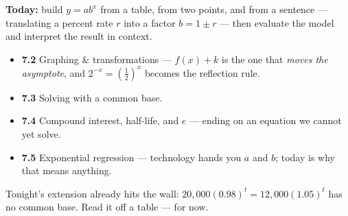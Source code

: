 \documentclass[aspectratio=169, 11pt]{beamer}
\begin{document}
\begin{frame}[t, plain]
  \textbf{Today:} build $y=ab^{x}$ from a table, from two points, and from a sentence --- translating
  a percent rate $r$ into a factor $b=1\pm r$ --- then evaluate the model and interpret the result in
  context.\\[8pt]
  \begin{itemize}\setlength{\itemsep}{3pt}
    \item \textbf{7.2} Graphing \& transformations --- $f(x)+k$ is the one that \emph{moves the asymptote}, and $2^{-x}=\left(\frac12\right)^{x}$ becomes the reflection rule.
    \item \textbf{7.3} Solving with a common base.
    \item \textbf{7.4} Compound interest, half-life, and $e$ --- ending on an equation we cannot yet solve.
    \item \textbf{7.5} Exponential regression --- technology hands you $a$ and $b$; today is why that means anything.
  \end{itemize}
  \vspace{6pt}
  \begin{center}
    {\footnotesize Tonight's extension already hits the wall: $20{,}000(0.98)^{t}=12{,}000(1.05)^{t}$
    has no common base. Read it off a table --- for now.}
  \end{center}
\end{frame}
\end{document}
